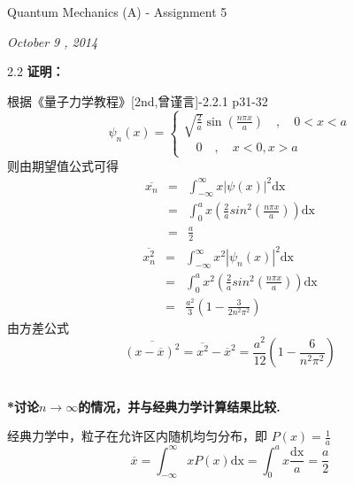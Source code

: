 \documentclass[a4paper]{article}
\begin{document}
    \begin{center}
        \textsf{\LARGE{Quantum Mechanics (A) - Assignment 5}}\\[20pt]
    \end{center}
    
    \noindent\Large{\emph{October 9 , 2014}}\\[15pt]
    \begin{CJK*}{UTF8}{song}
    2.2 \textbf{证明：}\\[12pt]
    {
     根据《量子力学教程》[2nd,曾谨言]-2.2.1 p31-32
    \[\psi_{n}(x) =\left\{
    \begin{array}{ll}
        \displaystyle\sqrt{\frac{2}{a}} \sin(\frac{n \pi x}{a}) \quad  ,  \quad 0 < x < a\\[12pt]
        \quad 0 \quad  ,  \quad x<0,x>a
    \end{array}
    \right.
    \]
    则由期望值公式可得
    \begin{eqnarray}
        \overline{x_{n}} & = & \int_{-\infty}^{\infty}x |\psi (x)|^{2} \mathrm{d x}\nonumber\\[5pt]
                     & = & \int_{0}^{a}x ( \frac{2}{a} sin^{2} (\frac{n \pi x}{a}) ) \mathrm{d x} \nonumber\\[5pt]
                     & = & \frac{a}{2} \nonumber
    \end{eqnarray}
    \begin{eqnarray}
        \overline{x^{2}_{n}} & = & \int_{-\infty}^{\infty}x^{2} |\psi_{n} (x)|^{2} \mathrm{d x}\nonumber\\[5pt]
            & = & \int_{0}^{a}x^{2} ( \frac{2}{a} sin^{2} (\frac{n \pi x}{a}) ) \mathrm{d x} \nonumber\\[5pt]
            & = & \frac{a^{2}}{3} (1 - \frac{3}{2 n^{2} {\pi}^{2}}) \nonumber
    \end{eqnarray}
    由方差公式
    \setcounter{equation}{1}
    $$\overline{( x - \overline{x})^{2}} = \overline{x^{2}} - \overline{x}^{2}
        = \frac{a^{2}}{12} ( 1 - \frac{6}{n^{2} {\pi}^{2}})$$ \\[8pt]
    \begin{CJK*}{UTF8}{kai}
    \noindent \textbf{*讨论$n\rightarrow\infty$的情况，并与经典力学计算结果比较.}\\[15pt]
    \end{CJK*}
    经典力学中，粒子在允许区内随机均匀分布，即 $\displaystyle P(x)=\frac{1}{a}$
    $$
        \overline{x}  =  \int_{-\infty}^{\infty}x P(x) \mathrm{d x}
                      =  \int_{0}^{a}x \frac{\mathrm{d x}}{a}
                      =  \frac{a}{2} \nonumber
$$}
\end{CJK*}
\end{document}
